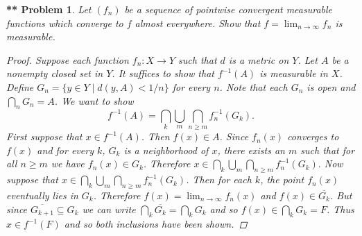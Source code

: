 \documentclass{article}
\newtheorem{**}{** Problem}
\begin{document}
\begin{**}
Let $(f_n)$ be a sequence of pointwise convergent measurable functions which converge to $f$ almost everywhere. Show that $f = \lim_{n \rightarrow \infty} f_n$ is measurable.
\begin{proof}
Suppose each function $f_n : X \rightarrow Y$ such that $d$ is a metric on $Y$. Let $A$ be a nonempty closed set in $Y$. It suffices to show that $f^{-1}(A)$ is measurable in $X$. Define $G_n = \{y \in Y \mid d(y, A) < 1/n\}$ for every $n$. Note that each $G_n$ is open and $\bigcap_{n} G_n = A$. We want to show
\[
f^{-1}(A) = \bigcap_{k} \bigcup_{m} \bigcap_{n \geq m} f_n^{-1} (G_k).
\]
First suppose that $x \in f^{-1}(A)$. Then $f(x) \in A$. Since $f_n(x)$ converges to $f(x)$ and for every $k$, $G_k$ is a neighborhood of $x$, there exists an $m$ such that for all $n \geq m$ we have $f_n(x) \in G_k$. Therefore $x \in \bigcap_{k} \bigcup_{m} \bigcap_{n \geq m} f_n^{-1} (G_k).$ Now suppose that $x \in \bigcap_{k} \bigcup_{m} \bigcap_{n \geq m} f_n^{-1} (G_k)$. Then for each $k$, the point $f_n(x)$ eventually lies in $G_k$. Therefore $f(x) = \lim_{n \rightarrow \infty} f_n(x)$ and $f(x) \in \overline{G_k}$. But since $\overline{G_{k+1}} \subseteq G_k$ we can write $\bigcap_{k} \overline{G_k} = \bigcap_{k} G_k$ and so $f(x) \in \bigcap_{k} G_k = F$. Thus $x \in f^{-1}(F)$ and so both inclusions have been shown.
\end{proof}
\end{**}
\end{document}

